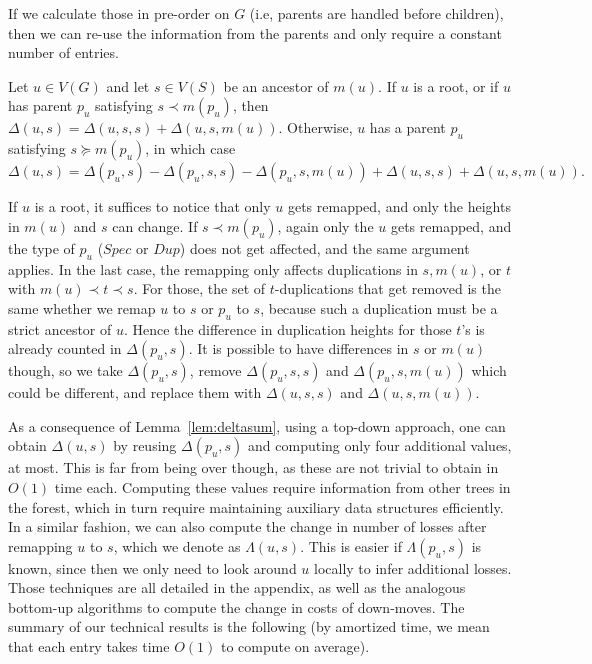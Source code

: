 \documentclass[10pt]{article}
\begin{document}
If we calculate those in pre-order on $G$ (i.e, parents are handled before children), then we can re-use the information from the parents and only require a constant number of entries.  

\begin{lemma}\label{lem:deltasum}
    Let $u \in V(G)$ and let $s \in V(S)$ be an ancestor of $m(u)$.
    If $u$ is a root, or if $u$ has parent $p_u$ satisfying $s \prec m(p_u)$, then $\Delta(u, s) = \Delta(u, s, s) + \Delta(u, s, m(u))$.
    Otherwise, $u$ has a parent $p_u$ satisfying $s \succeq m(p_u)$, in which case
    $\Delta(u, s) = \Delta(p_u, s) - \Delta(p_u, s, s) - \Delta(p_u, s, m(u)) 
    + \Delta(u, s, s) + \Delta(u, s, m(u)).$
\end{lemma}

\begin{proofsketch}
	If $u$ is a root, it suffices to notice that only $u$ gets remapped, and only the heights in $m(u)$ and $s$ can change.    If $s \prec m(p_u)$, again only the $u$ gets remapped, and the type of $p_u$ ($Spec$ or $Dup$) does not get affected, and the same argument applies.  In the last case, the remapping only affects duplications in $s, m(u)$, or $t$ with $m(u) \prec t \prec s$.  For those, the set of $t$-duplications that get removed is the same whether we remap $u$ to $s$ or $p_u$ to $s$, because such a duplication must be a strict ancestor of $u$.  Hence the difference in duplication heights for those $t$'s is already counted in $\Delta(p_u, s)$.  It is possible to have differences in $s$ or $m(u)$ though, so we take $\Delta(p_u, s)$, remove $\Delta(p_u, s, s)$ and $\Delta(p_u, s, m(u))$ which could be different, and replace them with $\Delta(u, s, s)$ and $\Delta(u, s, m(u))$.
\end{proofsketch}



    As a consequence of Lemma~\ref{lem:deltasum}, using a top-down approach, one can obtain $\Delta(u, s)$ by reusing $\Delta(p_u, s)$ and computing only four additional values, at most.
    This is far from being over though, as these are not trivial to obtain in $O(1)$ time each.  Computing these values require information from other trees in the forest, which in turn require maintaining auxiliary data structures efficiently.  In a similar fashion, we can also compute the change in number of losses after remapping $u$ to $s$, which we denote as $\Lambda(u, s)$.  This is easier if $\Lambda(p_u, s)$ is known, since then we only need to look around $u$ locally to infer additional losses.  
    Those techniques are all detailed in the appendix, as well as the analogous bottom-up algorithms to compute the change in costs of down-moves.  The summary of our technical results is the following (by amortized time, we mean that each entry takes time $O(1)$ to compute on average).
\end{document}
